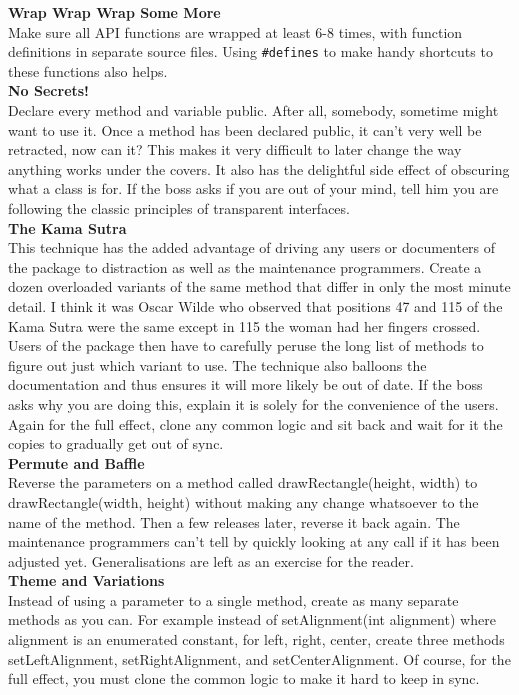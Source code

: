 \documentclass[11pt,twoside,a4paper]{article}
\begin{document}
\textbf{Wrap Wrap Wrap Some More}~\\
Make sure all API functions are wrapped at least 6-8 times, with function definitions in separate source files. Using \texttt{\#defines} to make handy shortcuts to these functions also helps.~\\ 

\textbf{No Secrets!}~\\
Declare every method and variable public. After all, somebody, sometime might want to use it. Once a method has been declared public, it can't very well be retracted, now can it? This makes it very difficult to later change the way anything works under the covers. It also has the delightful side effect of obscuring what a class is for. If the boss asks if you are out of your mind, tell him you are following the classic principles of transparent interfaces.~\\ 

\textbf{The Kama Sutra}~\\
This technique has the added advantage of driving any users or documenters of the package to distraction as well as the maintenance programmers. Create a dozen overloaded variants of the same method that differ in only the most minute detail. I think it was Oscar Wilde who observed that positions 47 and 115 of the Kama Sutra were the same except in 115 the woman had her fingers crossed. Users of the package then have to carefully peruse the long list of methods to figure out just which variant to use. The technique also balloons the documentation and thus ensures it will more likely be out of date. If the boss asks why you are doing this, explain it is solely for the convenience of the users. Again for the full effect, clone any common logic and sit back and wait for it the copies to gradually get out of sync.~\\ 

\textbf{Permute and Baffle}~\\
Reverse the parameters on a method called drawRectangle(height, width) to drawRectangle(width, height) without making any change whatsoever to the name of the method. Then a few releases later, reverse it back again. The maintenance programmers can't tell by quickly looking at any call if it has been adjusted yet. Generalisations are left as an exercise for the reader.~\\ 

\textbf{Theme and Variations}~\\
Instead of using a parameter to a single method, create as many separate methods as you can. For example instead of setAlignment(int alignment) where alignment is an enumerated constant, for left, right, center, create three methods setLeftAlignment, setRightAlignment, and setCenterAlignment. Of course, for the full effect, you must clone the common logic to make it hard to keep in sync.~\\ 
\end{document}
